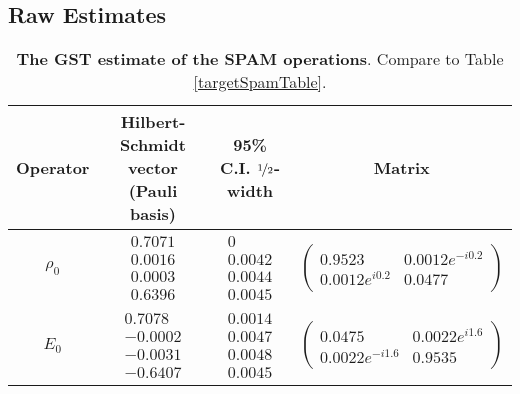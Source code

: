 \documentclass{article}[11pt]
\begin{document}
\FloatBarrier

\subsection{Raw Estimates}

\begin{table}[h]
\begin{center}
\begin{tabular}[l]{|c|c|c|c|}
\hline
Operator & Hilbert-Schmidt vector (Pauli basis) & 95\% C.I. $\nicefrac{1}{2}$-width & Matrix \\ \hline
$\rho_{0}$ & $ \begin{array}{c}
0.7071 \\ 
0.0016 \\ 
0.0003 \\ 
0.6396
 \end{array} $
 & $ \begin{array}{c}
0 \\ 
0.0042 \\ 
0.0044 \\ 
0.0045
 \end{array} $
 & $ \left(\!\!\begin{array}{cc}
0.9523 & 0.0012e^{-i0.2} \\ 
0.0012e^{i0.2} & 0.0477
 \end{array}\!\!\right) $
 \\ \hline
$E_{0}$ & $ \begin{array}{c}
0.7078 \\ 
-0.0002 \\ 
-0.0031 \\ 
-0.6407
 \end{array} $
 & $ \begin{array}{c}
0.0014 \\ 
0.0047 \\ 
0.0048 \\ 
0.0045
 \end{array} $
 & $ \left(\!\!\begin{array}{cc}
0.0475 & 0.0022e^{i1.6} \\ 
0.0022e^{-i1.6} & 0.9535
 \end{array}\!\!\right) $
 \\ \hline
\end{tabular}

\caption{\textbf{The GST estimate of the SPAM operations}.  Compare to Table \ref{targetSpamTable}.\label{bestGatesetSpamTable}}
\end{center}
\end{table}
\end{document}
